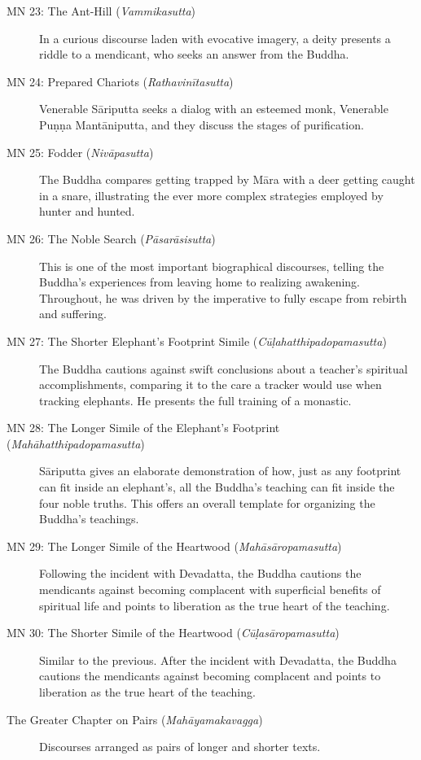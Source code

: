 \documentclass[12pt,openany]{book}%
\begin{document}
\begin{description}
\item[MN 23: The Ant-Hill (\textit{\textsanskrit{Vammikasutta}})] In a curious discourse laden with evocative imagery, a deity presents a riddle to a mendicant, who seeks an answer from the Buddha.%
\item[MN 24: Prepared Chariots (\textit{\textsanskrit{Rathavinītasutta}})] Venerable \textsanskrit{Sāriputta} seeks a dialog with an esteemed monk, Venerable \textsanskrit{Puṇṇa} \textsanskrit{Mantāniputta}, and they discuss the stages of purification.%
\item[MN 25: Fodder (\textit{\textsanskrit{Nivāpasutta}})] The Buddha compares getting trapped by \textsanskrit{Māra} with a deer getting caught in a snare, illustrating the ever more complex strategies employed by hunter and hunted.%
\item[MN 26: The Noble Search (\textit{\textsanskrit{Pāsarāsisutta}})] This is one of the most important biographical discourses, telling the Buddha’s experiences from leaving home to realizing awakening. Throughout, he was driven by the imperative to fully escape from rebirth and suffering.%
\item[MN 27: The Shorter Elephant’s Footprint Simile (\textit{\textsanskrit{Cūḷahatthipadopamasutta}})] The Buddha cautions against swift conclusions about a teacher’s spiritual accomplishments, comparing it to the care a tracker would use when tracking elephants. He presents the full training of a monastic.%
\item[MN 28: The Longer Simile of the Elephant’s Footprint (\textit{\textsanskrit{Mahāhatthipadopamasutta}})] \textsanskrit{Sāriputta} gives an elaborate demonstration of how, just as any footprint can fit inside an elephant’s, all the Buddha’s teaching can fit inside the four noble truths. This offers an overall template for organizing the Buddha’s teachings.%
\item[MN 29: The Longer Simile of the Heartwood (\textit{\textsanskrit{Mahāsāropamasutta}})] Following the incident with Devadatta, the Buddha cautions the mendicants against becoming complacent with superficial benefits of spiritual life and points to liberation as the true heart of the teaching.%
\item[MN 30: The Shorter Simile of the Heartwood (\textit{\textsanskrit{Cūḷasāropamasutta}})] Similar to the previous. After the incident with Devadatta, the Buddha cautions the mendicants against becoming complacent and points to liberation as the true heart of the teaching.%
\item[The Greater Chapter on Pairs (\textit{\textsanskrit{Mahāyamakavagga}})] Discourses arranged as pairs of longer and shorter texts.%

\end{description}
\end{document}
